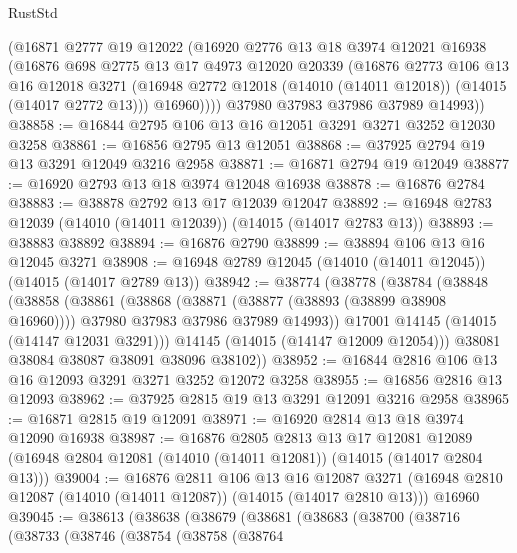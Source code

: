\begin{lexlean}{RustStd}
\begin{coremodule}
        (@16871
          @2777
          @19
          @12022
          (@16920
            @2776
            @13
            @18
            @3974
            @12021
            @16938
            (@16876
              @698
              @2775
              @13
              @17
              @4973
              @12020
              @20339
              (@16876
                @2773
                @106
                @13
                @16
                @12018
                @3271
                (@16948 @2772 @12018 (@14010 (@14011 @12018)) (@14015 (@14017 @2772 @13)))
                @16960))))
        @37980
        @37983
        @37986
        @37989
        @14993))
@38858 := @16844 @2795 @106 @13 @16 @12051 @3291 @3271 @3252 @12030 @3258
@38861 := @16856 @2795 @13 @12051
@38868 := @37925 @2794 @19 @13 @3291 @12049 @3216 @2958
@38871 := @16871 @2794 @19 @12049
@38877 := @16920 @2793 @13 @18 @3974 @12048 @16938
@38878 := @16876 @2784
@38883 := @38878 @2792 @13 @17 @12039 @12047
@38892 := @16948 @2783 @12039 (@14010 (@14011 @12039)) (@14015 (@14017 @2783 @13))
@38893 := @38883 @38892
@38894 := @16876 @2790
@38899 := @38894 @106 @13 @16 @12045 @3271
@38908 := @16948 @2789 @12045 (@14010 (@14011 @12045)) (@14015 (@14017 @2789 @13))
@38942 := @38774
    (@38778
      (@38784
        (@38848
          (@38858
            (@38861
              (@38868
                (@38871 (@38877 (@38893 (@38899 @38908 @16960))))
                @37980
                @37983
                @37986
                @37989
                @14993))
            @17001
            @14145
            (@14015 (@14147 @12031 @3291)))
          @14145
          (@14015 (@14147 @12009 @12054)))
        @38081
        @38084
        @38087
        @38091
        @38096
        @38102))
@38952 := @16844 @2816 @106 @13 @16 @12093 @3291 @3271 @3252 @12072 @3258
@38955 := @16856 @2816 @13 @12093
@38962 := @37925 @2815 @19 @13 @3291 @12091 @3216 @2958
@38965 := @16871 @2815 @19 @12091
@38971 := @16920 @2814 @13 @18 @3974 @12090 @16938
@38987 := @16876
    @2805
    @2813
    @13
    @17
    @12081
    @12089
    (@16948 @2804 @12081 (@14010 (@14011 @12081)) (@14015 (@14017 @2804 @13)))
@39004 := @16876
    @2811
    @106
    @13
    @16
    @12087
    @3271
    (@16948 @2810 @12087 (@14010 (@14011 @12087)) (@14015 (@14017 @2810 @13)))
    @16960
@39045 := @38613
    (@38638
      (@38679
        (@38681
          (@38683
            (@38700
              (@38716
                (@38733
                  (@38746
                    (@38754
                      (@38758
                        (@38764

\end{coremodule}
\end{lexlean}
